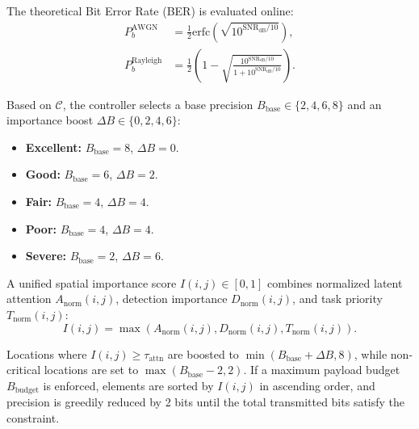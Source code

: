 \documentclass[journal,twocolumn]{IEEEtran}
\begin{document}
The theoretical Bit Error Rate (BER) is evaluated online:
\begin{align}
P_b^{\text{AWGN}} &= \frac{1}{2} \text{erfc}\left(\sqrt{10^{\text{SNR}_{\text{dB}} / 10}}\right), \label{eq:ber_awgn} \\
P_b^{\text{Rayleigh}} &= \frac{1}{2}\left(1 - \sqrt{\frac{10^{\text{SNR}_{\text{dB}} / 10}}{1 + 10^{\text{SNR}_{\text{dB}} / 10}}}\right). \label{eq:ber_rayleigh}
\end{align}

Based on $\mathcal{C}$, the controller selects a base precision $B_{\text{base}} \in \{2, 4, 6, 8\}$ and an importance boost $\Delta B \in \{0, 2, 4, 6\}$:
\begin{itemize}
    \item \textbf{Excellent:} $B_{\text{base}} = 8$, $\Delta B = 0$.
    \item \textbf{Good:} $B_{\text{base}} = 6$, $\Delta B = 2$.
    \item \textbf{Fair:} $B_{\text{base}} = 4$, $\Delta B = 4$.
    \item \textbf{Poor:} $B_{\text{base}} = 4$, $\Delta B = 4$.
    \item \textbf{Severe:} $B_{\text{base}} = 2$, $\Delta B = 6$.
\end{itemize}

A unified spatial importance score $I(i,j) \in [0, 1]$ combines normalized latent attention $A_{\text{norm}}(i,j)$, detection importance $D_{\text{norm}}(i,j)$, and task priority $T_{\text{norm}}(i,j)$:
\begin{equation}
I(i,j) = \max\left(A_{\text{norm}}(i,j), D_{\text{norm}}(i,j), T_{\text{norm}}(i,j)\right).
\label{eq:unified_importance}
\end{equation}

Locations where $I(i,j) \ge \tau_{\text{attn}}$ are boosted to $\min(B_{\text{base}} + \Delta B, 8)$, while non-critical locations are set to $\max(B_{\text{base}} - 2, 2)$. If a maximum payload budget $B_{\text{budget}}$ is enforced, elements are sorted by $I(i,j)$ in ascending order, and precision is greedily reduced by 2 bits until the total transmitted bits satisfy the constraint.
\end{document}
